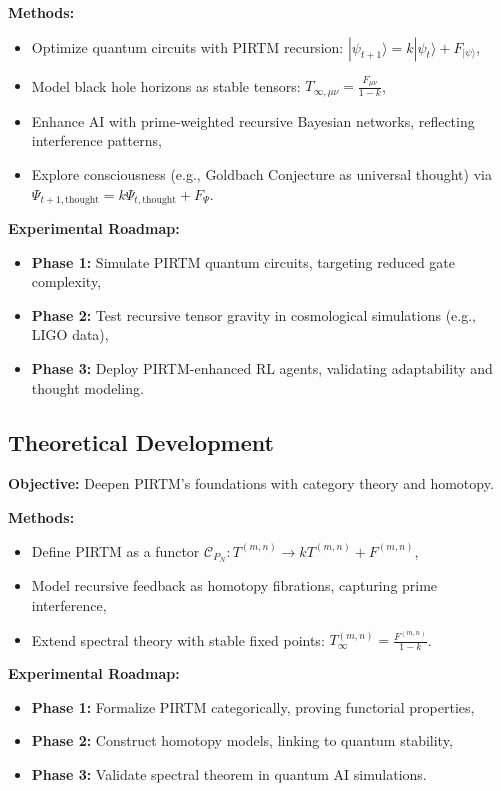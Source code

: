 \documentclass{article}
\theoremstyle{plain}
\begin{document}
\textbf{Methods:}
\begin{itemize}
    \item Optimize quantum circuits with PIRTM recursion: \( |\psi_{t+1}\rangle = k |\psi_t\rangle + F_{|\psi\rangle} \),
    \item Model black hole horizons as stable tensors: \( T_{\infty,\mu\nu} = \frac{F_{\mu\nu}}{1 - k} \),
    \item Enhance AI with prime-weighted recursive Bayesian networks, reflecting interference patterns,
    \item Explore consciousness (e.g., Goldbach Conjecture as universal thought) via \( \Psi_{t+1,\text{thought}} = k \Psi_{t,\text{thought}} + F_{\Psi} \).
\end{itemize}

\textbf{Experimental Roadmap:}
\begin{itemize}
    \item \textbf{Phase 1:} Simulate PIRTM quantum circuits, targeting reduced gate complexity,
    \item \textbf{Phase 2:} Test recursive tensor gravity in cosmological simulations (e.g., LIGO data),
    \item \textbf{Phase 3:} Deploy PIRTM-enhanced RL agents, validating adaptability and thought modeling.
\end{itemize}

\subsection{Theoretical Development}
\textbf{Objective:} Deepen PIRTM’s foundations with category theory and homotopy.

\textbf{Methods:}
\begin{itemize}
    \item Define PIRTM as a functor \( \mathcal{C}_{P_N}: T^{(m,n)} \to k T^{(m,n)} + F^{(m,n)} \),
    \item Model recursive feedback as homotopy fibrations, capturing prime interference,
    \item Extend spectral theory with stable fixed points: \( T_\infty^{(m,n)} = \frac{F^{(m,n)}}{1 - k} \).
\end{itemize}

\textbf{Experimental Roadmap:}
\begin{itemize}
    \item \textbf{Phase 1:} Formalize PIRTM categorically, proving functorial properties,
    \item \textbf{Phase 2:} Construct homotopy models, linking to quantum stability,
    \item \textbf{Phase 3:} Validate spectral theorem in quantum AI simulations.
\end{itemize}
\end{document}
